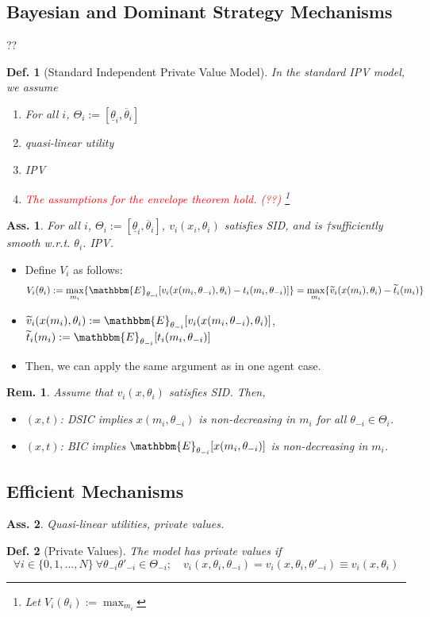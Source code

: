 \documentclass[11pt,a4paper,dvipdfmx]{article}
\theoremstyle{plain}
\newtheorem{df}{Def.}[section]
\newtheorem{rem}{Rem.}[section]
\newtheorem{ass}{Ass.}
\renewcommand{\tilde}{\widetilde}
\renewcommand{\bar}{\overline}
\newcommand{\E}{\mathbbm{E}}
\newcommand{\1}{\mathbbm{1}}
\newcommand{\ocomment}[1]{{\textcolor{red}{#1}}}
\begin{document}
\subsection{Bayesian and Dominant Strategy Mechanisms}
??
\begin{df}[Standard Independent Private Value Model]
	In the standard IPV model, we assume
	\begin{enumerate}
		\item For all $i$, $\Theta_i := [\underline{\theta}_i, \bar{\theta}_i]$
		\item quasi-linear utility
		\item IPV
		\item \ocomment{The assumptions for the envelope theorem hold. (??)} 
		\footnote{
		Let $V_i(\theta_i) := \max_{m_i}$
		}
	\end{enumerate}
\end{df}
\begin{ass}
	For all $i$, $\Theta_i := [\underline{\theta}_i, \bar{\theta}_i]$,  $v_i(x_i, \theta_i)$ satisfies SID, and is †sufficiently smooth w.r.t. $\theta_i$. IPV.
\end{ass}
\begin{itemize}
	\item Define $V_i$ as follows:
	\[V_i(\theta_i) := \max_{m_i} \{
	\E_{\theta_{-i}}[
	v_i(x(m_i, \theta_{-i}), \theta_i) - t_i(m_i, \theta_{-i}) 
	]\}
	= \max_{m_i} \{
	\tilde{v}_i(x(m_i), \theta_i) - \tilde{t}_i(m_i)
	\}
	\]
	\item $\tilde{v}_i(x(m_i), \theta_i) := \E_{\theta_{-i}}[
	v_i(x(m_i, \theta_{-i}), \theta_i)]$, $\tilde{t}_i(m_i) := \E_{\theta_{-i}}[t_i(m_i, \theta_{-i})]$
	\item Then, we can apply the same argument as in one agent case.
\end{itemize}

\begin{rem}
	Assume that $v_i(x, \theta_i)$ satisfies SID. Then,
	\begin{itemize}
		\item $(x,t)$: DSIC implies $x(m_i, \theta_{-i})$ is non-decreasing in $m_i$ for all $\theta_{-i} \in \Theta_i$.
		\item $(x,t)$: BIC implies $\E_{\theta_{-i}}[ x(m_i, \theta_{-i})]$ is non-decreasing in $m_i$.
	\end{itemize}
\end{rem}

\subsection{Efficient Mechanisms}
\begin{ass}
	Quasi-linear utilities, private values.
\end{ass}
\begin{df}[Private Values]
	The model has private values if
	\[
	\forall i \in \{0,1,\dots,N\} \ \forall \theta_{-i} \theta'_{-i} \in \Theta_{-i}; \quad
	v_i(x, \theta_i, \theta_{-i}) = v_i(x, \theta_i, \theta'_{-i}) \equiv v_i(x, \theta_i)
	\]
\end{df}
\end{document}
